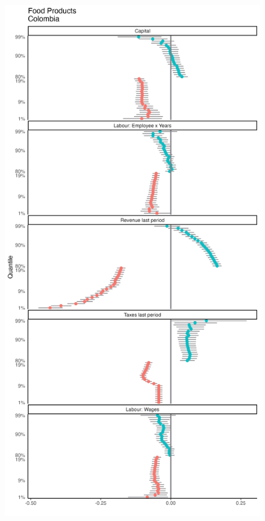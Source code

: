 \documentclass[
  12pt]{article}
\theoremstyle{definition}
\theoremstyle{remark}
\begin{document}
\begin{figure}

{\centering \includegraphics[width=\textwidth,height=1\textheight]{../Results/Figures/Colombia/311_by_size_diff.png}

}

\end{figure}
\end{document}
